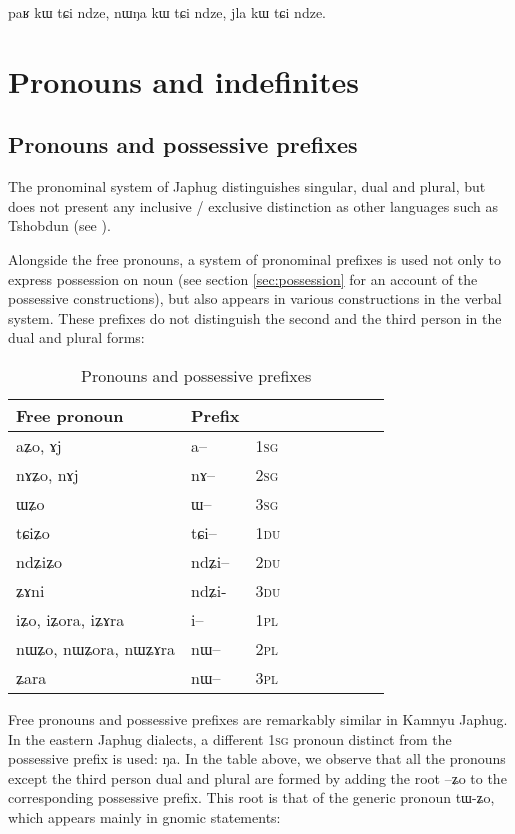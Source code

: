 \documentclass[oldfontcommands,oneside,a4paper,11pt]{memoir}
\newcommand{\ipa}[1]{{\phon #1}} %
\newcommand{\du}{\textsc{du}}
\newcommand{\pl}{\textsc{pl}}
\newcommand{\sg}{\textsc{sg}}
\begin{document}
paʁ kɯ tɕi ndze, nɯŋa kɯ tɕi ndze, jla kɯ tɕi ndze.


\chapter{Pronouns and indefinites}
\section{Pronouns and possessive prefixes} \label{sec:pronouns}

The pronominal system of Japhug distinguishes singular, dual and plural, but does not present any inclusive / exclusive distinction as other languages such as Tshobdun (see \citealt{jackson98morphology}).


Alongside the free pronouns, a system of pronominal prefixes is used not only to express  possession on noun (see section \ref{sec:possession}  for an account of the possessive constructions), but also appears in various constructions in the verbal system. These prefixes do not distinguish the second and the third person in the dual and plural forms:


\begin{table}[H] \centering
\caption{Pronouns and possessive prefixes }\label{tab:pronoun}
\begin{tabular}{lllllllll} \toprule
 Free pronoun & Prefix & \\
\midrule
 \ipa{aʑo},    \ipa{ɤj} &	\ipa{a--}  &		1\sg{} \\
\ipa{nɤʑo},  \ipa{nɤj} &	\ipa{nɤ--}  &			2\sg{} \\
\ipa{ɯʑo}  &	\ipa{ɯ--}  &			3\sg{} \\
\ipa{tɕiʑo}  &	\ipa{tɕi--}  &			1\du{} \\
\ipa{ndʑiʑo}  &	\ipa{ndʑi--}  &		2\du{} \\	
\ipa{ʑɤni}  &	\ipa{ndʑi-}  &		3\du{} \\	
\ipa{iʑo}, \ipa{iʑora},   \ipa{iʑɤra}   &	\ipa{i--}  &			1\pl{} \\
\ipa{nɯʑo}, \ipa{nɯʑora},   \ipa{nɯʑɤra}  &	\ipa{nɯ--}  &			2\pl{} \\
\ipa{ʑara}  &	\ipa{nɯ--}  &			3\pl{} \\
\bottomrule
\end{tabular}
\end{table}Free pronouns and possessive prefixes are remarkably similar in Kamnyu Japhug. In the eastern Japhug dialects, a different 1\sg{} pronoun distinct from the possessive prefix  is used: \ipa{ŋa}. In the table above, we observe that all the pronouns except the third person dual and plural are formed by adding the root --\ipa{ʑo} to the corresponding possessive prefix. This root is that of the generic pronoun \ipa{tɯ-ʑo}, which appears mainly in gnomic statements:
\end{document}
